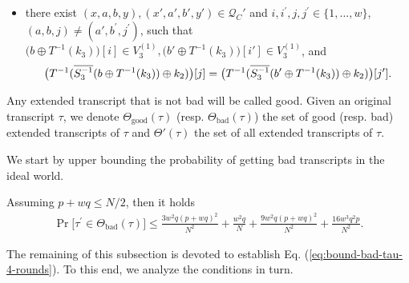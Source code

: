 \begin{definition}
\begin{itemize}[leftmargin=10mm]
$$	$$
	\item[\bsix] there exist $(x,a,b,y),(x',a',b',y') \in \mathcal{Q}_{C}'$ and $i, i^{\prime}, j, j^{\prime} \in\{1, \ldots, w\}$, $(a,b, j) \neq \left(a',b^{\prime}, j^{\prime}\right)$, such that $\big(b \oplus T^{-1}(k_3)\big)[i]\in V_{3}^{(1)}, \big(b' \oplus T^{-1}(k_3)\big)[i']\in V_{3}^{(1)}$, and
	$$\big(T^{-1}(\overline{S_3^{-1}}(b \oplus T^{-1}(k_3))\oplus k_2)\big)[j]=\big(T^{-1}(\overline{S_3^{-1}}(b' \oplus T^{-1}(k_3))\oplus k_2)\big)[j'].
	$$
\end{itemize}
Any extended transcript that is not bad will be called good. Given an original transcript $\tau$, we denote $\Theta_{\mathrm{good}}(\tau)$ (resp. $\Theta_{\mathrm{bad}}(\tau)$) the set of good (resp. bad) extended transcripts of $\tau$ and $\Theta'(\tau)$ the set of all extended transcripts of $\tau$.
\end{definition}



We start by upper bounding the probability of getting bad transcripts in the ideal world.

\begin{lemma}
	\label{lemma:bad-tau-4-rounds}
	
	Assuming $p+wq\leq N/2$, then it holds
	\begin{align}
	{\Pr}\big[\tau^{\prime} \in \Theta_{\mathrm{bad}}(\tau)\big] \leq \frac{3w^{2} q \left(p+w q\right)^{2}}{N^{2}} + \frac{w^{2} q}{N} + \frac{9w^2 q (p+w q)^{2}}{N^2}+ \frac{16w^3q^2p}{N^2}.
	\label{eq:bound-bad-tau-4-rounds}
	\end{align}
\end{lemma}

The remaining of this subsection is devoted to establish Eq. (\ref{eq:bound-bad-tau-4-rounds}). To this end, we analyze the conditions in turn.



